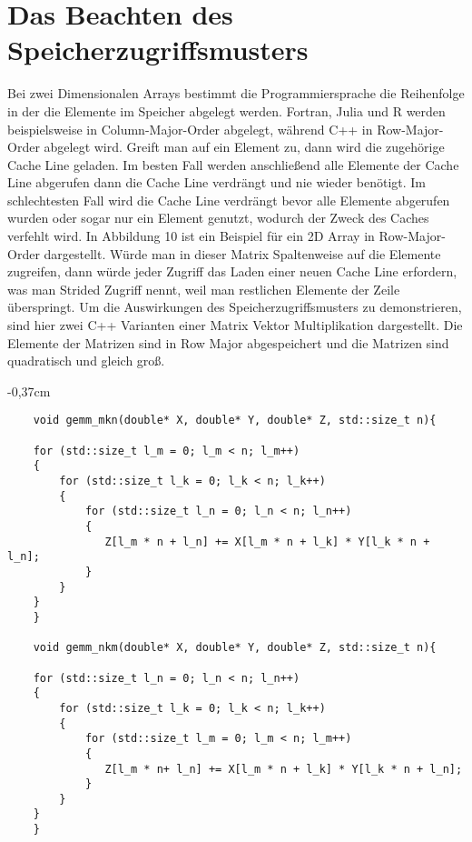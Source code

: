 \documentclass[sigconf,language=english]{acmart}
\begin{document}
\section{Das Beachten des Speicherzugriffsmusters}
    Bei zwei Dimensionalen Arrays bestimmt die Programmiersprache die Reihenfolge 
    in der die Elemente im Speicher abgelegt werden. Fortran, Julia und R werden beispielsweise
    in Column-Major-Order abgelegt, während C++ in Row-Major-Order abgelegt wird.
    Greift man auf ein Element zu, dann wird die zugehörige Cache Line geladen.
    Im besten Fall werden anschließend alle Elemente der Cache Line abgerufen dann die Cache Line verdrängt 
    und nie wieder benötigt. Im schlechtesten Fall wird die Cache Line verdrängt bevor alle Elemente abgerufen wurden 
    oder sogar nur ein Element genutzt, wodurch der Zweck des Caches verfehlt wird.
    In Abbildung 10 ist ein Beispiel für ein 2D Array in Row-Major-Order dargestellt. %
    Würde man in dieser Matrix Spaltenweise auf die Elemente zugreifen,
    dann würde jeder Zugriff das Laden einer neuen Cache Line erfordern, was man Strided Zugriff nennt, 
    weil man restlichen Elemente der Zeile überspringt.
    Um die Auswirkungen des Speicherzugriffsmusters zu demonstrieren, sind hier zwei C++ 
    Varianten einer Matrix Vektor Multiplikation dargestellt. Die Elemente der Matrizen sind 
    in Row Major abgespeichert und die Matrizen sind quadratisch und gleich groß.

    
\begin{tiny}
\begin{adjustwidth}{-0,37cm}{}
\begin{footnotesize}
\begin{verbatim}
    void gemm_mkn(double* X, double* Y, double* Z, std::size_t n){

    for (std::size_t l_m = 0; l_m < n; l_m++)
    {
        for (std::size_t l_k = 0; l_k < n; l_k++)
        {
            for (std::size_t l_n = 0; l_n < n; l_n++)
            {
               Z[l_m * n + l_n] += X[l_m * n + l_k] * Y[l_k * n + l_n];
            }
        }
    }
    }
    
    void gemm_nkm(double* X, double* Y, double* Z, std::size_t n){
    
    for (std::size_t l_n = 0; l_n < n; l_n++)
    {
        for (std::size_t l_k = 0; l_k < n; l_k++)
        {
            for (std::size_t l_m = 0; l_m < n; l_m++)
            {
               Z[l_m * n+ l_n] += X[l_m * n + l_k] * Y[l_k * n + l_n];
            }
        }
    }
    }
\end{verbatim}
\end{footnotesize}
\end{adjustwidth}
\end{tiny}
\end{document}
